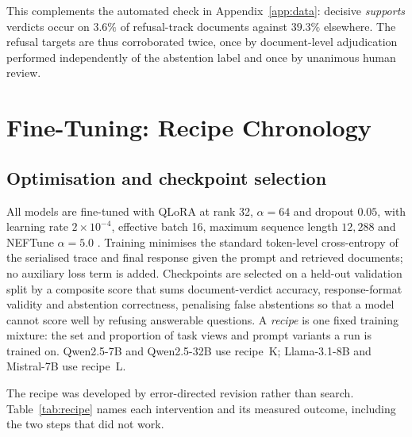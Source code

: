 This complements the automated check in Appendix~\ref{app:data}: decisive
\textit{supports} verdicts occur on $3.6\%$ of refusal-track documents against
$39.3\%$ elsewhere. The refusal targets are thus corroborated twice, once by
document-level adjudication performed independently of the abstention label and
once by unanimous human review.

\section{Fine-Tuning: Recipe Chronology}
\label{app:sft}

\subsection{Optimisation and checkpoint selection}

All models are fine-tuned with QLoRA
\citep{dettmers2023qloraefficientfinetuningquantized,hu2021loralowrankadaptationlarge}
at rank 32, $\alpha=64$ and dropout $0.05$, with learning rate
$2\times10^{-4}$, effective batch 16, maximum sequence length $12{,}288$ and
NEFTune $\alpha=5.0$ \citep{jain2023neftune}. Training minimises the standard
token-level cross-entropy of the serialised trace and final response given the
prompt and retrieved documents; no auxiliary loss term is added. Checkpoints are
selected on a held-out validation split by a composite score that sums
document-verdict accuracy, response-format validity and abstention correctness,
penalising false abstentions so that a model cannot score well by refusing
answerable questions. A \emph{recipe} is one fixed training mixture: the set and
proportion of task views and prompt variants a run is trained on. Qwen2.5-7B and
Qwen2.5-32B use recipe~K; Llama-3.1-8B and Mistral-7B use recipe~L.

The recipe was developed by error-directed revision rather than search.
Table~\ref{tab:recipe} names each intervention and its measured outcome,
including the two steps that did not work.

